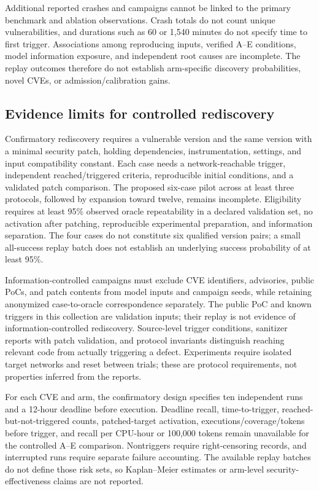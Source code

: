 \documentclass[final,5p,times,number]{elsarticle}
\begin{document}
Additional reported crashes and campaigns cannot be linked to the primary benchmark and ablation observations. Crash totals do not count unique vulnerabilities, and durations such as 60 or 1,540 minutes do not specify time to first trigger. Associations among reproducing inputs, verified A--E conditions, model information exposure, and independent root causes are incomplete. The replay outcomes therefore do not establish arm-specific discovery probabilities, novel CVEs, or admission/calibration gains.

\subsection{Evidence limits for controlled rediscovery}
Confirmatory rediscovery requires a vulnerable version and the same version with a minimal security patch, holding dependencies, instrumentation, settings, and input compatibility constant. Each case needs a network-reachable trigger, independent reached/triggered criteria, reproducible initial conditions, and a validated patch comparison. The proposed six-case pilot across at least three protocols, followed by expansion toward twelve, remains incomplete. Eligibility requires at least 95\% observed oracle repeatability in a declared validation set, no activation after patching, reproducible experimental preparation, and information separation. The four cases do not constitute six qualified version pairs; a small all-success replay batch does not establish an underlying success probability of at least 95\%.

Information-controlled campaigns must exclude CVE identifiers, advisories, public PoCs, and patch contents from model inputs and campaign seeds, while retaining anonymized case-to-oracle correspondence separately. The public PoC and known triggers in this collection are validation inputs; their replay is not evidence of information-controlled rediscovery. Source-level trigger conditions, sanitizer reports with patch validation, and protocol invariants distinguish reaching relevant code from actually triggering a defect. Experiments require isolated target networks and reset between trials; these are protocol requirements, not properties inferred from the reports.

For each CVE and arm, the confirmatory design specifies ten independent runs and a 12-hour deadline before execution. Deadline recall, time-to-trigger, reached-but-not-triggered counts, patched-target activation, executions/coverage/tokens before trigger, and recall per CPU-hour or 100,000 tokens remain unavailable for the controlled A--E comparison. Nontriggers require right-censoring records, and interrupted runs require separate failure accounting. The available replay batches do not define those risk sets, so Kaplan--Meier estimates or arm-level security-effectiveness claims are not reported.
\end{document}
